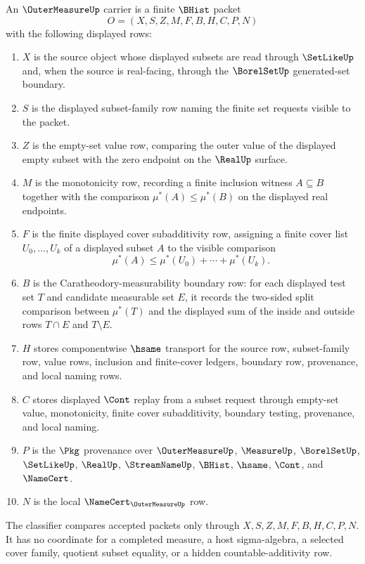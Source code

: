 \begin{definition}
\label{def:outer-measure-carrier}
An $\OuterMeasureUp$ carrier is a finite $\BHist$ packet
$$
O=(X,S,Z,M,F,B,H,C,P,N)
$$
with the following displayed rows:
\begin{enumerate}
\item $X$ is the source object whose displayed subsets are read through $\SetLikeUp$ and, when the source is real-facing, through the $\BorelSetUp$ generated-set boundary.
\item $S$ is the displayed subset-family row naming the finite set requests visible to the packet.
\item $Z$ is the empty-set value row, comparing the outer value of the displayed empty subset with the zero endpoint on the $\RealUp$ surface.
\item $M$ is the monotonicity row, recording a finite inclusion witness $A\subseteq B$ together with the comparison $\mu^*(A)\leq\mu^*(B)$ on the displayed real endpoints.
\item $F$ is the finite displayed cover subadditivity row, assigning a finite cover list $U_0,\ldots,U_k$ of a displayed subset $A$ to the visible comparison
$$
\mu^*(A)\leq \mu^*(U_0)+\cdots+\mu^*(U_k).
$$
\item $B$ is the Caratheodory-measurability boundary row: for each displayed test set $T$ and candidate measurable set $E$, it records the two-sided split comparison between $\mu^*(T)$ and the displayed sum of the inside and outside rows $T\cap E$ and $T\setminus E$.
\item $H$ stores componentwise $\hsame$ transport for the source row, subset-family row, value rows, inclusion and finite-cover ledgers, boundary row, provenance, and local naming rows.
\item $C$ stores displayed $\Cont$ replay from a subset request through empty-set value, monotonicity, finite cover subadditivity, boundary testing, provenance, and local naming.
\item $P$ is the $\Pkg$ provenance over $\OuterMeasureUp$, $\MeasureUp$, $\BorelSetUp$, $\SetLikeUp$, $\RealUp$, $\StreamNameUp$, $\BHist$, $\hsame$, $\Cont$, and $\NameCert$.
\item $N$ is the local $\NameCert_{\OuterMeasureUp}$ row.
\end{enumerate}
The classifier compares accepted packets only through $X,S,Z,M,F,B,H,C,P,N$. It has no coordinate for a completed measure, a host sigma-algebra, a selected cover family, quotient subset equality, or a hidden countable-additivity row.
\end{definition}


